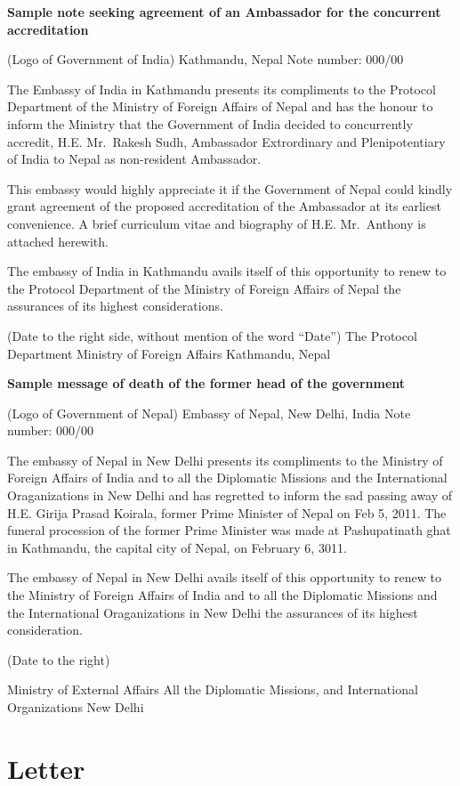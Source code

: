 \documentclass[
  openany]{book}
\begin{document}
\textbf{Sample note seeking agreement of an Ambassador for the concurrent accreditation}

(Logo of Government of India)
Kathmandu, Nepal
Note number: 000/00

The Embassy of India in Kathmandu presents its compliments to the Protocol Department of the Ministry of Foreign Affairs of Nepal and has the honour to inform the Ministry that the Government of India decided to concurrently accredit, H.E. Mr.~Rakesh Sudh, Ambassador Extrordinary and Plenipotentiary of India to Nepal as non-resident Ambassador.

This embassy would highly appreciate it if the Government of Nepal could kindly grant agreement of the proposed accreditation of the Ambassador at its earliest convenience. A brief curriculum vitae and biography of H.E. Mr.~Anthony is attached herewith.

The embassy of India in Kathmandu avails itself of this opportunity to renew to the Protocol Department of the Ministry of Foreign Affairs of Nepal the assurances of its highest considerations.

(Date to the right side, without mention of the word ``Date'')
The Protocol Department
Ministry of Foreign Affairs
Kathmandu, Nepal

\textbf{Sample message of death of the former head of the government}

(Logo of Government of Nepal)
Embassy of Nepal,
New Delhi, India
Note number: 000/00

The embassy of Nepal in New Delhi presents its compliments to the Ministry of Foreign Affairs of India and to all the Diplomatic Missions and the International Oraganizations in New Delhi and has regretted to inform the sad passing away of H.E. Girija Prasad Koirala, former Prime Minister of Nepal on Feb 5, 2011. The funeral procession of the former Prime Minister was made at Pashupatinath ghat in Kathmandu, the capital city of Nepal, on February 6, 3011.

The embassy of Nepal in New Delhi avails itself of this opportunity to renew to the Ministry of Foreign Affairs of India and to all the Diplomatic Missions and the International Oraganizations in New Delhi the assurances of its highest consideration.

(Date to the right)

Ministry of External Affairs
All the Diplomatic Missions, and
International Organizations
New Delhi

\hypertarget{letter}{%
\section{Letter}\label{letter}}
\end{document}
